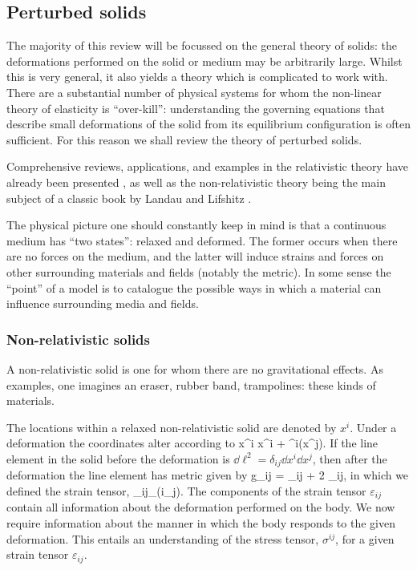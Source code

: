 \subsection{Perturbed solids}
The majority of this review will be focussed on the general theory of solids: the deformations performed on the solid or medium may be arbitrarily large. Whilst this is very general, it also yields a theory which is complicated to work with. There are a substantial number of physical systems for whom the non-linear theory of elasticity is ``over-kill'': understanding the governing equations that describe small deformations of the solid from its equilibrium configuration is often sufficient. For this reason we shall review the theory of perturbed solids.

Comprehensive reviews, applications, and examples in the relativistic theory have already been presented \cite{Carter:1973zz, Carter:1977qf, Bucher:1998mh, Battye:2005ik, Battye:2007aa, Battye:2013er, Pearson:2014iaa}, as well as the non-relativistic theory being the main subject of a classic book by Landau and Lifshitz \cite{ll_elast}.

The physical picture one should constantly keep in mind is that a continuous medium has ``two states'': relaxed and deformed. The former occurs when there are no forces on the medium, and the latter will induce strains and forces on other surrounding materials and fields (notably the metric). In some sense the ``point'' of a model is to catalogue the possible ways in which a material can influence surrounding media and fields. 



\subsubsection{Non-relativistic solids}
A non-relativistic solid is one for whom there are no gravitational effects. As examples, one imagines an eraser, rubber band, trampolines: these kinds of materials.

The locations within a relaxed non-relativistic solid are denoted by $x^i$. Under a deformation the coordinates alter according to 
\bea
x^i \longrightarrow x^i + \xi^i(x^j).
\eea
 If the line element in the solid before the deformation is $\dd\ell^2 = \delta_{ij} \dd x^i \dd x^j$, then after the deformation the line element has metric  given by
\bea
g_{ij} = \delta_{ij} + 2 \varepsilon_{ij},
\eea
in which we defined the strain tensor,
\bea
\label{non-rel-strain-defn}
\varepsilon_{ij} \partial_{(i}\xi_{j)}.
\eea
The components of the strain tensor $\varepsilon_{ij}$ contain all information about the deformation performed on the body. We now require information about the manner in which the body responds to the given deformation. This   entails   an understanding of the stress tensor, $\sigma^{ij}$, for a given strain tensor $\varepsilon_{ij}$. 

